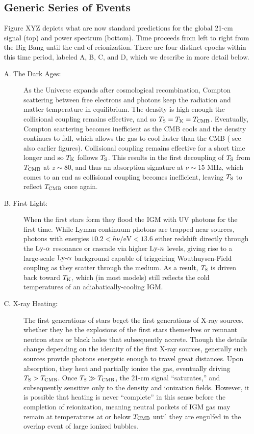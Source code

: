 \subsection{Generic Series of Events}
{\color{red} Figure XYZ} depicts what are now standard predictions for the global 21-cm signal (top) and power spectrum (bottom). Time proceeds from left to right from the Big Bang until the end of reionization. There are four distinct epochs within this time period, labeled A, B, C, and D, which we describe in more detail below.
\begin{description}
	\item[A. The Dark Ages:] As the Universe expands after cosmological recombination, Compton scattering between free electrons and photons keep the radiation and matter temperature in equilibrium. The density is high enough the collisional coupling remains effective, and so $T_{\text{S}} = T_{\text{K}} = T_{\text{CMB}}$. Eventually, Compton scattering becomes inefficient as the CMB cools and the density continues to fall, which allows the gas to cool faster than the CMB ({\color{red} see also earlier figures}). Collisional coupling remains effective for a short time longer and so $T_{\text{K}}$ follows $T_{\text{S}}$. This results in the first decoupling of $T_{\text{S}}$ from $T_{\text{CMB}}$ at $z \sim 80$, and thus an absorption signature at $\nu \sim 15$ MHz, which comes to an end as collisional coupling becomes inefficient, leaving $T_{\text{S}}$ to reflect $T_{\text{CMB}}$ once again.
	\item[B. First Light:] When the first stars form they flood the IGM with UV photons for the first time. While Lyman continuum photons are trapped near sources, photons with energies $10.2 < h\nu / \mathrm{eV} < 13.6$ either redshift directly through the $\text{Ly-}\alpha$ resonance or cascade via higher $\text{Ly-}n$ levels, giving rise to a large-scale $\text{Ly-}\alpha$ background capable of triggeiring Wouthuysen-Field coupling as they scatter through the medium. As a result, $T_{\text{S}}$ is driven back toward $T_{\text{K}}$, which (in most models) still reflects the cold temperatures of an adiabatically-cooling IGM.
	\item[C. X-ray Heating:] The first generations of stars beget the first generations of X-ray sources, whether they be the explosions of the first stars themselves or remnant neutron stars or black holes that subsequently accrete. Though the details change depending on the identity of the first X-ray sources, generally such sources provide photons energetic enough to travel great distances. Upon absorption, they heat and partially ionize the gas, eventually driving $T_{\text{S}} > T_{\text{CMB}}$. Once $T_{\text{S}} \gg T_{\text{CMB}}$, the 21-cm signal ``saturates,'' and subsequently sensitive only to the density and ionization fields. However, it is possible that heating is never ``complete'' in this sense before the completion of reionization, meaning neutral pockets of IGM gas may remain at temperatures at or below $T_{\text{CMB}}$ until they are engulfed in the overlap event of large ionized bubbles.

\end{description}
